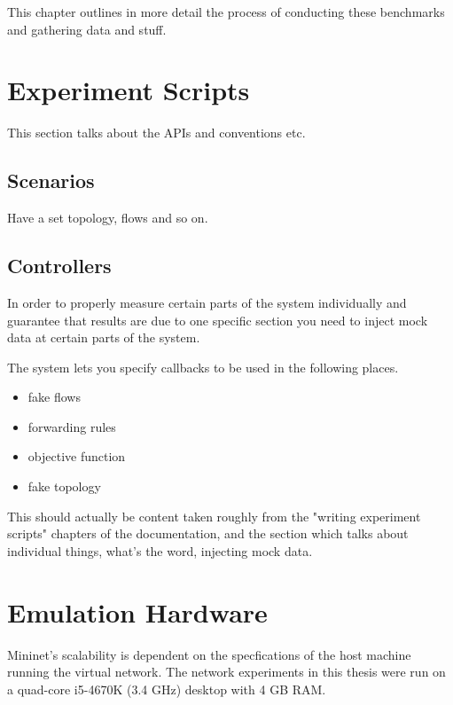This chapter outlines in more detail the process of conducting these benchmarks and gathering data and stuff.

\section{Experiment Scripts}
This section talks about the APIs and conventions etc.

\subsection{Scenarios}
Have a set topology, flows and so on.

\subsection{Controllers}
In order to properly measure certain parts of the system individually and guarantee that results are due to one specific section you need to inject mock data at certain parts of the system.

The system lets you specify callbacks to be used in the following places.

\begin{itemize}
\item fake flows
\item forwarding rules
\item objective function
\item fake topology
\end{itemize}

This should actually be content taken roughly from the "writing experiment scripts" chapters of the documentation, and the section which talks about individual things, what's the word, injecting mock data.

\section{Emulation Hardware}

Mininet's scalability is dependent on the specfications of the host machine running the virtual network. The network experiments in this thesis were run on a quad-core i5-4670K (3.4 GHz) desktop with 4 GB RAM.
